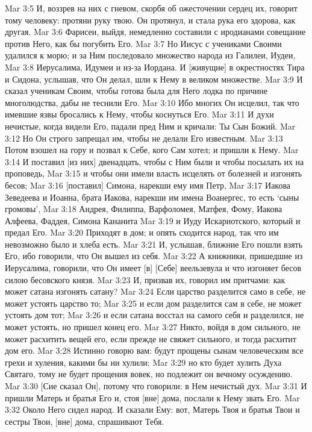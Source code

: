 Mar 3:5  И, воззрев на них с гневом, скорбя об ожесточении сердец их, говорит тому человеку: протяни руку твою. Он протянул, и стала рука его здорова, как другая.
Mar 3:6  Фарисеи, выйдя, немедленно составили с иродианами совещание против Него, как бы погубить Его.
Mar 3:7  Но Иисус с учениками Своими удалился к морю; и за Ним последовало множество народа из Галилеи, Иудеи,
Mar 3:8  Иерусалима, Идумеи и из-за Иордана. И [живущие] в окрестностях Тира и Сидона, услышав, что Он делал, шли к Нему в великом множестве.
Mar 3:9  И сказал ученикам Своим, чтобы готова была для Него лодка по причине многолюдства, дабы не теснили Его.
Mar 3:10  Ибо многих Он исцелил, так что имевшие язвы бросались к Нему, чтобы коснуться Его.
Mar 3:11  И духи нечистые, когда видели Его, падали пред Ним и кричали: Ты Сын Божий.
Mar 3:12  Но Он строго запрещал им, чтобы не делали Его известным.
Mar 3:13  Потом взошел на гору и позвал к Себе, кого Сам хотел; и пришли к Нему.
Mar 3:14  И поставил [из них] двенадцать, чтобы с Ним были и чтобы посылать их на проповедь,
Mar 3:15  и чтобы они имели власть исцелять от болезней и изгонять бесов;
Mar 3:16  [поставил] Симона, нарекши ему имя Петр,
Mar 3:17  Иакова Зеведеева и Иоанна, брата Иакова, нарекши им имена Воанергес, то есть `сыны громовы',
Mar 3:18  Андрея, Филиппа, Варфоломея, Матфея, Фому, Иакова Алфеева, Фаддея, Симона Кананита
Mar 3:19  и Иуду Искариотского, который и предал Его.
Mar 3:20  Приходят в дом; и опять сходится народ, так что им невозможно было и хлеба есть.
Mar 3:21  И, услышав, ближние Его пошли взять Его, ибо говорили, что Он вышел из себя.
Mar 3:22  А книжники, пришедшие из Иерусалима, говорили, что Он имеет [в] [Себе] веельзевула и что изгоняет бесов силою бесовского князя.
Mar 3:23  И, призвав их, говорил им притчами: как может сатана изгонять сатану?
Mar 3:24  Если царство разделится само в себе, не может устоять царство то;
Mar 3:25  и если дом разделится сам в себе, не может устоять дом тот;
Mar 3:26  и если сатана восстал на самого себя и разделился, не может устоять, но пришел конец его.
Mar 3:27  Никто, войдя в дом сильного, не может расхитить вещей его, если прежде не свяжет сильного, и тогда расхитит дом его.
Mar 3:28  Истинно говорю вам: будут прощены сынам человеческим все грехи и хуления, какими бы ни хулили;
Mar 3:29  но кто будет хулить Духа Святаго, тому не будет прощения вовек, но подлежит он вечному осуждению.
Mar 3:30  [Сие сказал Он], потому что говорили: в Нем нечистый дух.
Mar 3:31  И пришли Матерь и братья Его и, стоя [вне] дома, послали к Нему звать Его.
Mar 3:32  Около Него сидел народ. И сказали Ему: вот, Матерь Твоя и братья Твои и сестры Твои, [вне] дома, спрашивают Тебя.
